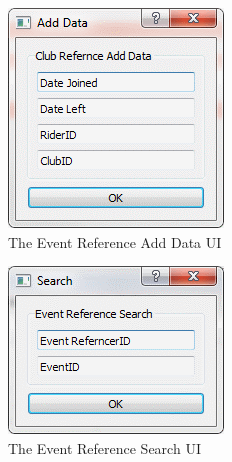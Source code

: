 \begin{figure}
\includegraphics[width=\textwidth]{./Maintenance/UI/EventRefAD.png}
\caption{The Event Reference Add Data UI} \label{fig:EventRefAD_UI}
\end{figure}

\begin{figure}
\includegraphics[width=\textwidth]{./Maintenance/UI/EventRefSearch.png}
\caption{The Event Reference Search UI} \label{fig:EventRefSearch_UI}
\end{figure}

